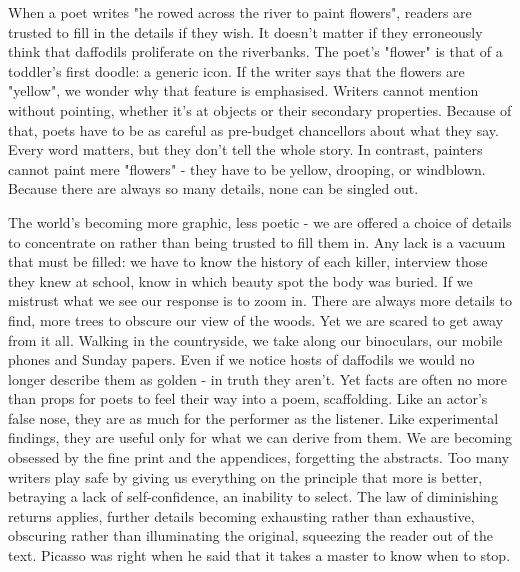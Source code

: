 \documentclass[11pt]{article}
\begin{document}
When a poet writes "he rowed across the river to paint flowers", readers are trusted to fill in the details if they wish. It doesn't matter if they erroneously think that daffodils proliferate on the riverbanks. The poet's "flower" is that of a toddler's first doodle: a generic icon. If the writer says that the flowers are "yellow", we wonder why that feature is emphasised. Writers cannot mention without pointing, whether it's at objects or their secondary properties. Because of that, poets have to be as careful as pre-budget chancellors about what they say. Every word matters, but they don't tell the whole story. In contrast, painters cannot paint mere "flowers" - they have to be yellow, drooping, or windblown. Because there are always so many details, none can be singled out.

The world's becoming more graphic, less poetic - we are offered a choice of details to concentrate on rather than being trusted to fill them in. Any lack is a vacuum that must be filled: we have to know the history of each killer, interview those they knew at school, know in which beauty spot the body was buried. If we mistrust what we see our response is to zoom in. There are always more details to find, more trees to obscure our view of the woods. Yet we are scared to get away from it all. Walking in the countryside, we take along our binoculars, our mobile phones and Sunday papers. Even if we notice hosts of daffodils we would no longer describe them as golden - in truth they aren't. Yet facts are often no more than props for poets to feel their way into a poem, scaffolding. Like an actor's false nose, they are as much for the performer as the listener. Like experimental findings, they are useful only for what we can derive from them. We are becoming obsessed by the fine print and the appendices, forgetting the abstracts. Too many writers play safe by giving us everything on the principle that more is better, betraying a lack of self-confidence, an inability to select. The law of diminishing returns applies, further details becoming exhausting rather than exhaustive, obscuring rather than illuminating the original, squeezing the reader out of the text. Picasso was right when he said that it takes a master to know when to stop.
\end{document}
